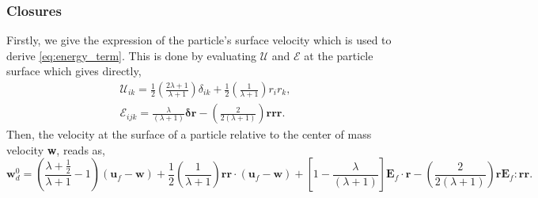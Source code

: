 \subsubsection*{Closures}
Firstly, we give the expression of the particle's surface velocity which is used to derive \ref{eq:energy_term}. 
This is done by evaluating $\mathcal{U}$ and $\mathcal{E}$ at the particle surface which gives directly, 
\begin{align}
    \mathcal{U}_{ik} = 
    \frac{1}{2}\left(\frac{2\lambda + 1}{\lambda +1}\right)
    \delta_{ik} 
    + 
    \frac{1}{2}\left(\frac{1}{\lambda +1}\right)
    r_ir_k,  \\
    \mathcal{E}_{ijk}
    = 
    \frac{\lambda}{(\lambda + 1)}
    \bm\delta\textbf{r}
    -\left(\frac{2}{2(\lambda +1 )} \right) \textbf{rrr}. 
\end{align}
Then, the velocity at the surface of a particle relative to the center of mass velocity \textbf{w}, reads as, 
\begin{equation*}
    \textbf{w}_d^0 
    = \left(\frac{\lambda + \frac{1}{2}}{\lambda +1} - 1\right)
    (\textbf{u}_f - \textbf{w}) 
    + 
    \frac{1}{2}\left(\frac{1}{\lambda +1}\right)
    \textbf{rr} \cdot (\textbf{u}_f - \textbf{w})  
    + \left[1-\frac{\lambda}{(\lambda + 1)}\right]\textbf{E}_f\cdot\textbf{r}
    -\left(\frac{2}{2(\lambda +1 )} \right) \textbf{r} \textbf{E}_f:\textbf{rr}. 
\end{equation*}

